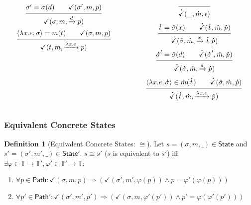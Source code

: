 \documentclass{beamer}
\theoremstyle{definition}
\newtheorem*{definition*}{Definition}
\newcommand*{\A}[1]{\overset{\,_{\mbox{\Large .}}}{#1}}
\newcommand*{\modid}{d}
\newcommand*{\Time}{\mathbb{T}}
\newcommand*{\ctx}{\sigma}
\newcommand*{\mem}{m}
\newcommand*{\State}{\mathsf{State}}
\newcommand*{\valid}{\checkmark}
\newcommand*{\Path}{\mathsf{Path}}
\newcommand*{\equivalent}{\cong}
\begin{document}
\begin{frame}[c]
\begin{columns}
\begin{column}{0.3\linewidth}
\[\begin{prooftree}
          \hypo{\ctx'=\ctx(\modid)\qquad\valid(\ctx',\mem,p)}
          \infer1{\valid(\ctx,\mem,\xrightarrow{\modid}p)}
        \end{prooftree}
      \]
      \[
        \begin{prooftree}
          \hypo{\langle\lambda x.e,{\ctx}\rangle=\mem(t)\qquad\valid(\ctx,\mem,p)}
          \infer1{\valid(t,\mem,\xrightarrow{\lambda x.e}p)}
        \end{prooftree}
      \]
    \end{column}
    \begin{column}{0.3\linewidth}
      \scriptsize
      \[
        \begin{prooftree}
          \infer0{\A\valid(\_,\A\mem,\epsilon)}
        \end{prooftree}
      \]
      \[
        \begin{prooftree}
          \hypo{\A{t}=\A\ctx(x)\qquad\A\valid(\A{t},\A\mem,\A{p})}
          \infer1{\A\valid(\A\ctx,\A\mem,\xrightarrow{x}\A{t}\:\A{p})}
        \end{prooftree}
      \]
      \[
        \begin{prooftree}
          \hypo{\A\ctx'=\A\ctx(\modid)\qquad\A\valid(\A\ctx',\A\mem,\A{p})}
          \infer1{\A\valid(\A\ctx,\A\mem,\xrightarrow{\modid}\A{p})}
        \end{prooftree}
      \]
      \[
        \begin{prooftree}
          \hypo{\langle\lambda x.e,{\A\ctx}\rangle\in\A\mem(\A{t})\qquad\A\valid(\A\ctx,\A\mem,\A{p})}
          \infer1{\A\valid(\A{t},\A\mem,\xrightarrow{\lambda x.e}\A{p})}
        \end{prooftree}
      \]
    \end{column}
  \end{columns}
\end{frame}
\begin{frame}[c]
  \frametitle{Equivalent Concrete States}
  \begin{definition*}[Equivalent Concrete States: $\equivalent$]
    Let $s=(\ctx,\mem,\_)\in\State$ and $s'=(\ctx',\mem',\_)\in\State'$.
    $s\equivalent s'$ ($s$ is equivalent to $s'$) iff $\exists\varphi\in\Time\rightarrow\Time',\varphi'\in\Time'\rightarrow\Time:$
    \begin{enumerate}
      \item $\forall p\in\Path:\valid(\ctx,\mem,p)\Rightarrow(\valid(\ctx',\mem',\varphi(p))\land p=\varphi'(\varphi(p)))$
      \item $\forall p'\in\Path':\valid(\ctx',\mem',p')\Rightarrow(\valid(\ctx,\mem,\varphi'(p'))\land p'=\varphi(\varphi'(p')))$
    \end{enumerate}
  \end{definition*}
\end{frame}
\end{document}
